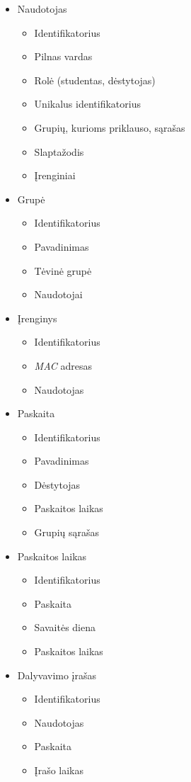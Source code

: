 \documentclass{VUMIFPSkursinis}
\begin{document}
\begin{itemize}
    \item Naudotojas
    \begin{itemize}
        \item Identifikatorius
        \item Pilnas vardas
        \item Rolė (studentas, dėstytojas)
        \item Unikalus identifikatorius
        \item Grupių, kurioms priklauso, sąrašas
        \item Slaptažodis
        \item Įrenginiai
    \end{itemize}
    \item Grupė
    \begin{itemize}
        \item Identifikatorius
        \item Pavadinimas
        \item Tėvinė grupė
        \item Naudotojai
    \end{itemize}
    \item Įrenginys
    \begin{itemize}
        \item Identifikatorius
        \item \textit{MAC} adresas
        \item Naudotojas
    \end{itemize}
    \item Paskaita
    \begin{itemize}
        \item Identifikatorius
        \item Pavadinimas
        \item Dėstytojas
        \item Paskaitos laikas
        \item Grupių sąrašas
    \end{itemize}
    \item Paskaitos laikas
    \begin{itemize}
        \item Identifikatorius
        \item Paskaita
        \item Savaitės diena
        \item Paskaitos laikas
    \end{itemize}
    \item Dalyvavimo įrašas
    \begin{itemize}
        \item Identifikatorius
        \item Naudotojas
        \item Paskaita
        \item Įrašo laikas
    \end{itemize}
\end{itemize}
\end{document}
